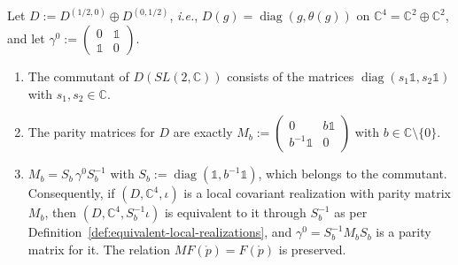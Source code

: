 \begin{lemma}\label{lem:parity-matrix-unique}
	Let $D:=D^{(1/2,0)}\oplus D^{(0,1/2)}$, \textit{i.e.}, $D(g)=\operatorname{diag}(g,\theta(g))$ on $\mathbb{C}^4=\mathbb{C}^2\oplus\mathbb{C}^2$, and let $\gamma^0:=\begin{pmatrix}0&\mathbb{1}\\\mathbb{1}&0\end{pmatrix}$.
	\begin{enumerate}
		\item The commutant of $D(SL(2,\mathbb{C}))$ consists of the matrices $\operatorname{diag}(s_1\mathbb{1},s_2\mathbb{1})$ with $s_1,s_2\in\mathbb{C}$.
		\item The parity matrices for $D$ are exactly $M_b:=\begin{pmatrix}0&b\mathbb{1}\\b^{-1}\mathbb{1}&0\end{pmatrix}$ with $b\in\mathbb{C}\setminus\{0\}$.
		\item $M_b=S_b\,\gamma^0S_b^{-1}$ with $S_b:=\operatorname{diag}(\mathbb{1},b^{-1}\mathbb{1})$, which belongs to the commutant. Consequently, if $(D,\mathbb{C}^4,\iota)$ is a local covariant realization with parity matrix $M_b$, then $(D,\mathbb{C}^4,S_b^{-1}\iota)$ is equivalent to it through $S_b^{-1}$ as per Definition~\ref{def:equivalent-local-realizations}, and $\gamma^0=S_b^{-1}M_bS_b$ is a parity matrix for it. The relation $M F(\mathring{p})=F(\mathring{p})$ is preserved.
	\end{enumerate}
\end{lemma}

